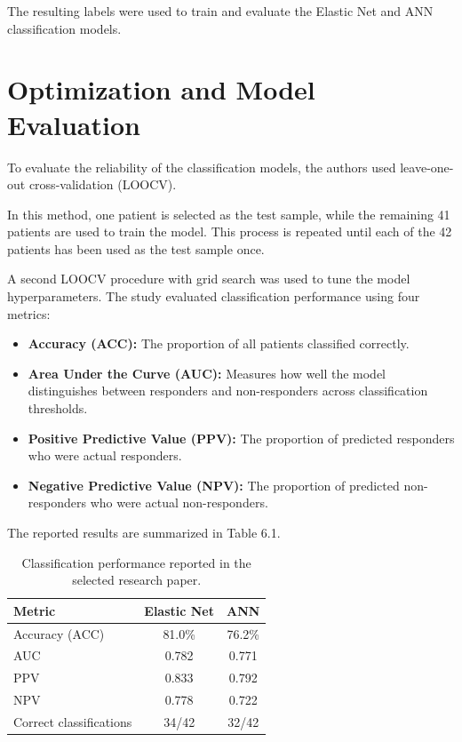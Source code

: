 The resulting labels were used to train and evaluate the Elastic Net and ANN classification models.

\section{{Optimization and Model Evaluation}}

To evaluate the reliability of the classification models, the authors used leave-one-out cross-validation (LOOCV).

In this method, one patient is selected as the test sample, while the remaining 41 patients are used to train the model. This process is repeated until each of the 42 patients has been used as the test sample once.

A second LOOCV procedure with grid search was used to tune the model hyperparameters. The study evaluated classification performance using four metrics:

\begin{itemize}
    \item \textbf{Accuracy (ACC):} The proportion of all patients classified correctly.
    \item \textbf{Area Under the Curve (AUC):} Measures how well the model distinguishes between responders and non-responders across classification thresholds.
    \item \textbf{Positive Predictive Value (PPV):} The proportion of predicted responders who were actual responders.
    \item \textbf{Negative Predictive Value (NPV):} The proportion of predicted non-responders who were actual non-responders.
\end{itemize}

The reported results are summarized in Table 6.1.

\begin{table}[htbp]
    \centering
    \begin{tabular}{|l|c|c|}
        \hline
        \textbf{Metric} & \textbf{Elastic Net} & \textbf{ANN} \\
        \hline
        Accuracy (ACC) & 81.0\% & 76.2\% \\
        \hline
        AUC & 0.782 & 0.771 \\
        \hline
        PPV & 0.833 & 0.792 \\
        \hline
        NPV & 0.778 & 0.722 \\
        \hline
        Correct classifications & 34/42 & 32/42 \\
        \hline
    \end{tabular}

    \caption{Classification performance reported in the selected research paper.}
    \label{tab:classification-performance}
\end{table}


